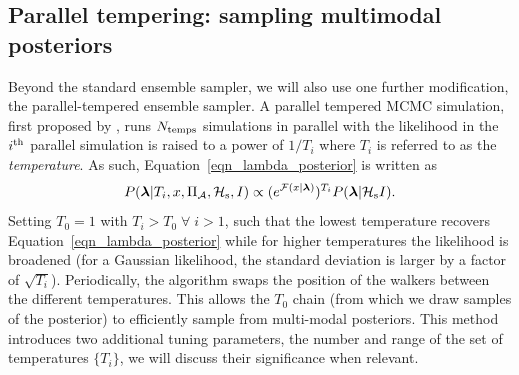 \documentclass[aps, prd, twocolumn, superscriptaddress, floatfix, showpacs, nofootinbib, longbibliography]{revtex4-1}
\begin{document}
\subsection{Parallel tempering: sampling multimodal posteriors}
\label{sec_parallel_tempering}
Beyond the standard ensemble sampler, we will also use one further
modification, the parallel-tempered ensemble sampler. A parallel
tempered MCMC simulation, first proposed by \citet{swendsen1986}, runs
$N_{\rm temps}$ simulations in parallel with the likelihood in the $i^{\rm th}$
parallel simulation is raised to a power of $1/T_{i}$ where $T_i$ is referred
to as the \emph{temperature}. As such, Equation~\eqref{eqn_lambda_posterior} is
written as
\begin{equation}
P(\boldsymbol{\mathbf{\lambda}} | T_i, x, \Pi_\mathcal{A}, \mathcal{H}_{\rm s}, I)
\propto (e^{{\mathcal{F}}(x| \boldsymbol{\mathbf{\lambda}})})^{T_i} P(\boldsymbol{\mathbf{\lambda}}| \mathcal{H}_{\rm s} I).
\end{equation}
Setting $T_0=1$ with $T_i > T_0 \; \forall \; i > 1$, such that the lowest
temperature recovers Equation~\eqref{eqn_lambda_posterior} while for higher
temperatures the likelihood is broadened (for a Gaussian likelihood, the
standard deviation is larger by a factor of $\sqrt{T_i}$). Periodically, the
algorithm swaps the position of the walkers between the different
temperatures. This allows the $T_0$ chain (from which we draw samples of the
posterior) to efficiently sample from multi-modal posteriors. This method introduces
two additional tuning parameters, the number and range of the set of
temperatures $\{T_i\}$, we will discuss their significance when relevant.
\end{document}

